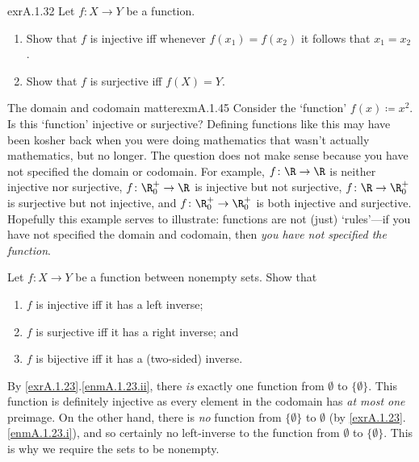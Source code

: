 \begin{exr}{}{exrA.1.32}
Let $f\colon X\rightarrow Y$ be a function.
\begin{enumerate}
\item \label{exrA.1.32.i}Show that $f$ is injective iff whenever $f(x_1)=f(x_2)$ it follows that $x_1=x_2$.
\item \label{exrA.1.32.ii}Show that $f$ is surjective iff $f(X)=Y$.
\end{enumerate}
\end{exr}
\begin{exm}{The domain and codomain matter}{exmA.1.45}
Consider the `function' $f(x)\coloneqq x^2$.  Is this `function' injective or surjective?  Defining functions like this may have been kosher back when you were doing mathematics that wasn't actually mathematics, but no longer.  The question does not make sense because you have not specified the domain or codomain.  For example, $f\colon \R \rightarrow \R$ is neither injective nor surjective, $f\colon \R _0^+\rightarrow \R$ is injective but not surjective, $f\colon \R \rightarrow \R _0^+$ is surjective but not injective, and $f\colon \R _0^+\rightarrow \R _0^+$ is both injective and surjective.  Hopefully this example serves to illustrate:  functions are not (just) `rules'---if you have not specified the domain and codomain, then \emph{you have not specified the function}.
\end{exm}
\begin{exr}{}{}
Let $f\colon X\rightarrow Y$ be a function between nonempty sets.  Show that
\begin{enumerate}\label{exrA.1.9}
\item \label{enmA.1.9.i}$f$ is injective iff it has a left inverse;
\item \label{enmA.1.9.ii}$f$ is surjective iff it has a right inverse; and
\item \label{enmA.1.9.iii}$f$ is bijective iff it has a (two-sided) inverse.
\end{enumerate}
\begin{rmk}
By \cref{exrA.1.23}.\cref{enmA.1.23.ii}, there \emph{is} exactly one function from $\emptyset$ to $\{ \emptyset \}$.  This function is definitely injective as every element in the codomain has \emph{at most one} preimage.  On the other hand, there is \emph{no} function from $\{ \emptyset \}$ to $\emptyset$ (by \cref{exrA.1.23}.\cref{enmA.1.23.i}), and so certainly no left-inverse to the function from $\emptyset$ to $\{ \emptyset \}$.  This is why we require the sets to be nonempty.
\end{rmk}
\end{exr}
